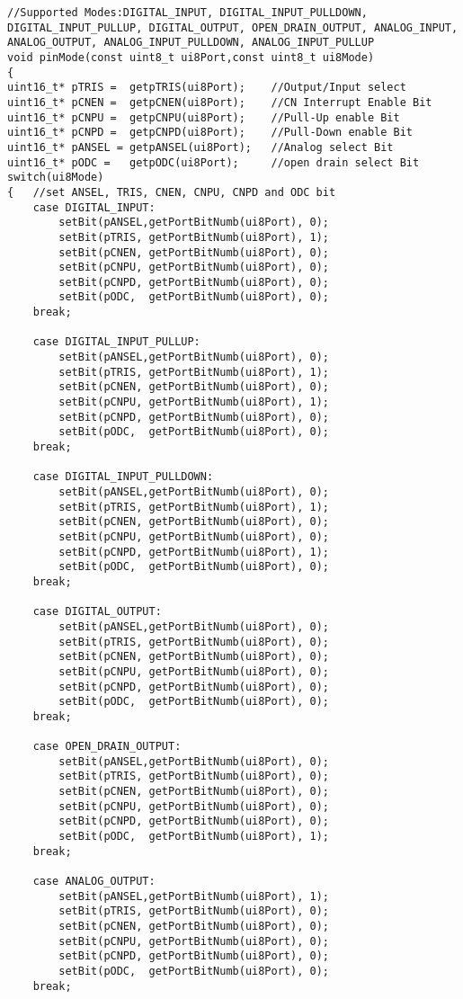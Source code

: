 \newpage
\begin{lstlisting}[frame=htrbl, caption={pinMode() Funktion}, label={lst:pinmode}]
//Supported Modes:DIGITAL_INPUT, DIGITAL_INPUT_PULLDOWN, DIGITAL_INPUT_PULLUP, DIGITAL_OUTPUT, OPEN_DRAIN_OUTPUT, ANALOG_INPUT, ANALOG_OUTPUT, ANALOG_INPUT_PULLDOWN, ANALOG_INPUT_PULLUP
void pinMode(const uint8_t ui8Port,const uint8_t ui8Mode)
{
uint16_t* pTRIS =  getpTRIS(ui8Port);    //Output/Input select
uint16_t* pCNEN =  getpCNEN(ui8Port);    //CN Interrupt Enable Bit
uint16_t* pCNPU =  getpCNPU(ui8Port);    //Pull-Up enable Bit
uint16_t* pCNPD =  getpCNPD(ui8Port);    //Pull-Down enable Bit
uint16_t* pANSEL = getpANSEL(ui8Port);   //Analog select Bit
uint16_t* pODC =   getpODC(ui8Port);     //open drain select Bit
switch(ui8Mode)
{   //set ANSEL, TRIS, CNEN, CNPU, CNPD and ODC bit
	case DIGITAL_INPUT:
		setBit(pANSEL,getPortBitNumb(ui8Port), 0);
		setBit(pTRIS, getPortBitNumb(ui8Port), 1);      
		setBit(pCNEN, getPortBitNumb(ui8Port), 0);
		setBit(pCNPU, getPortBitNumb(ui8Port), 0);
		setBit(pCNPD, getPortBitNumb(ui8Port), 0);
		setBit(pODC,  getPortBitNumb(ui8Port), 0);
	break;
	
	case DIGITAL_INPUT_PULLUP:
		setBit(pANSEL,getPortBitNumb(ui8Port), 0);
		setBit(pTRIS, getPortBitNumb(ui8Port), 1);      
		setBit(pCNEN, getPortBitNumb(ui8Port), 0);
		setBit(pCNPU, getPortBitNumb(ui8Port), 1);
		setBit(pCNPD, getPortBitNumb(ui8Port), 0);
		setBit(pODC,  getPortBitNumb(ui8Port), 0);
	break;
	
	case DIGITAL_INPUT_PULLDOWN:
		setBit(pANSEL,getPortBitNumb(ui8Port), 0);
		setBit(pTRIS, getPortBitNumb(ui8Port), 1);      
		setBit(pCNEN, getPortBitNumb(ui8Port), 0);
		setBit(pCNPU, getPortBitNumb(ui8Port), 0);
		setBit(pCNPD, getPortBitNumb(ui8Port), 1);
		setBit(pODC,  getPortBitNumb(ui8Port), 0);
	break;
	
	case DIGITAL_OUTPUT:
		setBit(pANSEL,getPortBitNumb(ui8Port), 0);
		setBit(pTRIS, getPortBitNumb(ui8Port), 0);      
		setBit(pCNEN, getPortBitNumb(ui8Port), 0);
		setBit(pCNPU, getPortBitNumb(ui8Port), 0);
		setBit(pCNPD, getPortBitNumb(ui8Port), 0);
		setBit(pODC,  getPortBitNumb(ui8Port), 0);
	break;
	
	case OPEN_DRAIN_OUTPUT:
		setBit(pANSEL,getPortBitNumb(ui8Port), 0);
		setBit(pTRIS, getPortBitNumb(ui8Port), 0);      
		setBit(pCNEN, getPortBitNumb(ui8Port), 0);
		setBit(pCNPU, getPortBitNumb(ui8Port), 0);
		setBit(pCNPD, getPortBitNumb(ui8Port), 0);
		setBit(pODC,  getPortBitNumb(ui8Port), 1);
	break;
	
	case ANALOG_OUTPUT:
		setBit(pANSEL,getPortBitNumb(ui8Port), 1);
		setBit(pTRIS, getPortBitNumb(ui8Port), 0);      
		setBit(pCNEN, getPortBitNumb(ui8Port), 0);
		setBit(pCNPU, getPortBitNumb(ui8Port), 0);
		setBit(pCNPD, getPortBitNumb(ui8Port), 0);
		setBit(pODC,  getPortBitNumb(ui8Port), 0);
	break;
	

\end{lstlisting}
